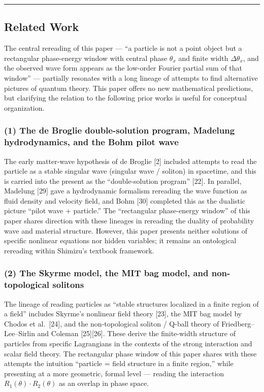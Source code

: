 \documentclass[
]{article}
\begin{document}
\begin{center}\rule{0.5\linewidth}{0.5pt}\end{center}

\subsection{Related Work}\label{related-work}

The central rereading of this paper --- ``a particle is not a point
object but a rectangular phase-energy window with central phase
\(\theta_x\) and finite width \(\Delta\theta_x\), and the observed wave
form appears as the low-order Fourier partial sum of that window'' ---
partially resonates with a long lineage of attempts to find alternative
pictures of quantum theory. This paper offers no new mathematical
predictions, but clarifying the relation to the following prior works is
useful for conceptual organization.

\subsubsection{(1) The de Broglie double-solution program, Madelung
hydrodynamics, and the Bohm pilot
wave}\label{the-de-broglie-double-solution-program-madelung-hydrodynamics-and-the-bohm-pilot-wave}

The early matter-wave hypothesis of de Broglie {[}2{]} included attempts
to read the particle as a stable singular wave (singular wave / soliton)
in spacetime, and this is carried into the present as the
``double-solution program'' {[}22{]}. In parallel, Madelung {[}29{]}
gave a hydrodynamic formalism rereading the wave function as fluid
density and velocity field, and Bohm {[}30{]} completed this as the
dualistic picture ``pilot wave + particle.'' The ``rectangular
phase-energy window'' of this paper shares direction with these lineages
in rereading the duality of probability wave and material structure.
However, this paper presents neither solutions of specific nonlinear
equations nor hidden variables; it remains an ontological rereading
within Shimizu's textbook framework.

\subsubsection{(2) The Skyrme model, the MIT bag model, and
non-topological
solitons}\label{the-skyrme-model-the-mit-bag-model-and-non-topological-solitons}

The lineage of reading particles as ``stable structures localized in a
finite region of a field'' includes Skyrme's nonlinear field theory
{[}23{]}, the MIT bag model by Chodos et al.~{[}24{]}, and the
non-topological soliton / Q-ball theory of Friedberg--Lee--Sirlin and
Coleman {[}25{]}{[}26{]}. These derive the finite-width structure of
particles from specific Lagrangians in the contexts of the strong
interaction and scalar field theory. The rectangular phase window of
this paper shares with these attempts the intuition ``particle = field
structure in a finite region,'' while presenting at a more geometric,
formal level --- reading the interaction
\(R_1(\theta) \cdot R_2(\theta)\) as an overlap in phase space.
\end{document}

